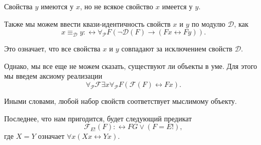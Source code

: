 \documentclass[openany]{book}
\theoremstyle{plain}
\theoremstyle{definition}
\begin{document}
Свойства \(y\) имеются у \(x\), но не всякое свойство \(x\) имеется у \(y\).

Также мы можем ввести квази-идентичность свойств \(x\) и \(y\) по модулю \(\mathcal{D}\), как
\[x \equiv_{\mathcal{D}} y :\leftrightarrow \forall_{\mathcal{P}} F (\neg \mathcal{D}(F) \to (Fx \leftrightarrow Fy)).\]

Это означает, что все свойства \(x\) и \(y\) совпадают за исключением свойств \(\mathcal{D}\).

Однако, мы все еще не можем сказать, существуют ли объекты в уме. Для этого мы введем аксиому реализации \[\forall_{\mathcal{P}} \mathcal{F} \exists x \forall_{\mathcal{P}} F (\mathcal{F} (F) \leftrightarrow F x).\]

Иными словами, любой набор свойств соответствует мыслимому объекту.

Последнее, что нам пригодится, будет следующий предикат 
\[\mathcal{F}_{E!} (F) :\leftrightarrow FG \lor (F = E!),\]
где \(X = Y\) означает \(\forall x (X x \leftrightarrow Y x)\).
\end{document}
